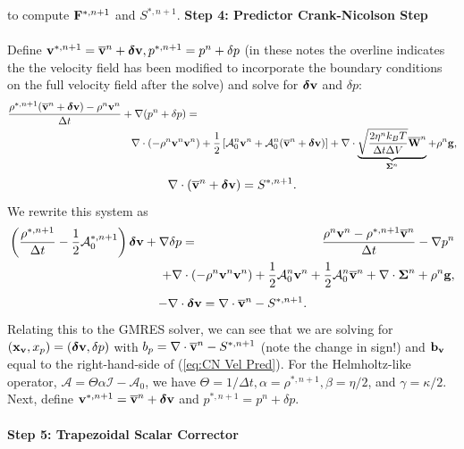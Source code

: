 \documentclass[final]{siamltex}
\def\bb {{\bf b}}
\def\Fb {{\bf F}}
\def\gb {{\bf g}}
\def\vb {{\bf v}}
\def\Wb {{\bf W}}
\def\xb {{\bf x}}
\def\deltab {\boldsymbol{\delta}}
\def\Sigmab {\boldsymbol{\Sigma}}
\def\half   {\frac{1}{2}}
\begin{document}
to compute $\Fb^{*,n+1}$ and $S^{*,n+1}$.
{\bf Step 4: Predictor Crank-Nicolson Step}\\ \\
Define $\vb^{*,n+1} = \overline\vb^n + \deltab\vb, p^{*,n+1} = p^n + \delta p$ (in these notes the overline
indicates the the velocity field has been modified to incorporate the boundary conditions on the
full velocity field after the solve) and solve
for $\deltab\vb$ and $\delta p$:
\begin{eqnarray}
\frac{\rho^{*,n+1}(\overline\vb^n + \deltab\vb) - \rho^n\vb^n}{\Delta t} + \nabla(p^n+\delta p) &=&\nonumber\\
&&\hspace{-1in}\nabla\cdot(-\rho^n\vb^n\vb^n) + \half\left[\mathcal{A}_0^n\vb^n + \mathcal{A}_0^n(\overline\vb^n + \deltab\vb)\right] + \nabla\cdot\underbrace{\sqrt{\frac{2\eta^n k_B T}{\Delta t\Delta V}}\overline\Wb^n}_{\Sigmab^n} + \rho^n\gb,\nonumber\\
\end{eqnarray}
\begin{equation}
\nabla\cdot(\overline\vb^n+\deltab\vb) = S^{*,n+1}.
\end{equation}
We rewrite this system as
\begin{eqnarray}
\left(\frac{\rho^{*,n+1}}{\Delta t} - \half\mathcal{A}_0^{*,n+1}\right)\deltab\vb + \nabla\delta p &=& \frac{\rho^n\vb^n-\rho^{*,n+1}\overline\vb^n}{\Delta t} -\nabla p^n\nonumber\\
&&\hspace{-0.5in}+ \nabla\cdot(-\rho^n\vb^n\vb^n) + \half\mathcal{A}_0^n\vb^n + \half\mathcal{A}_0^n\overline\vb^n + \nabla\cdot\Sigmab^n + \rho^n\gb,\label{eq:CN Vel Pred}
\end{eqnarray}
\begin{equation}
-\nabla\cdot\deltab\vb = \nabla\cdot\overline\vb^n - S^{*,n+1}.
\end{equation}
Relating this to the GMRES solver, we can see that we are solving for 
$(\xb_\vb,x_p) = (\deltab\vb,\delta p)$ with $b_p = \nabla\cdot\overline\vb^n-S^{*,n+1}$ (note the change in sign!) 
and $\bb_\vb$ equal to the right-hand-side of (\ref{eq:CN Vel Pred}).  For the Helmholtz-like operator, 
$\mathcal{A}=\Theta\alpha\mathcal{I} - \mathcal{A}_0$, we have $\Theta=1/\Delta t, \alpha=\rho^{*,n+1}, 
\beta=\eta/2$, and $\gamma=\kappa/2$.
Next, define $\vb^{*,n+1} = \overline\vb^n + \deltab\vb$ and $p^{*,n+1} = p^n + \delta p$.\\ \\
{\bf Step 5: Trapezoidal Scalar Corrector}\\ \\
\end{document}
